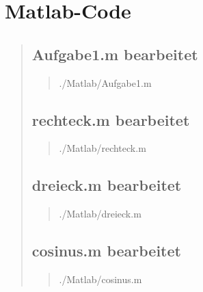\section{Matlab-Code}
\begin{quote}
    \subsection{Aufgabe1.m bearbeitet}
    \begin{quote}
            
            {./Matlab/Aufgabe1.m}
    \end{quote}
    \subsection{rechteck.m bearbeitet}
    \begin{quote}
            
            {./Matlab/rechteck.m}
    \end{quote}
    \subsection{dreieck.m bearbeitet}
    \begin{quote}
            
            {./Matlab/dreieck.m}        
    \end{quote}
    \subsection{cosinus.m bearbeitet}
    \begin{quote}
            
            {./Matlab/cosinus.m}        
    \end{quote}                 	
\end{quote}


